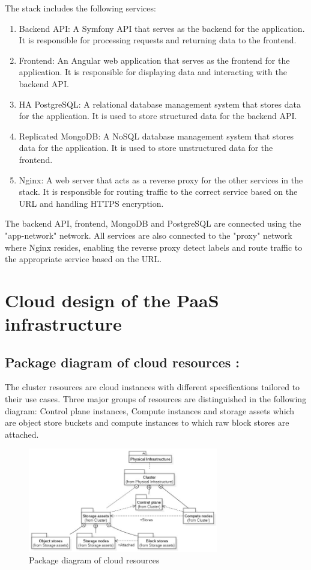 The stack includes the following services: 
\begin{enumerate}
\item Backend API: A Symfony\cite{Symfony} API that serves as the backend for the application. It is responsible for processing requests and returning data to the frontend. 
\item Frontend: An Angular\cite{Angular} web application that serves as the frontend for the application. It is responsible for displaying data and interacting with the backend API. 
\item HA PostgreSQL\cite{PostgreSQL}: A relational database management system that stores data for the application. It is used to store structured data for the backend API. 
\item Replicated MongoDB\cite{MongoDB}: A NoSQL database management system that stores data for the application. It is used to store unstructured data for the frontend. 
\item Nginx\cite{Nginx}: A web server that acts as a reverse proxy for the other services in the stack. It is responsible for routing traffic to the correct service based on the URL and handling HTTPS encryption. 
\end{enumerate}

The backend API, frontend, MongoDB and PostgreSQL are connected using the "app-network" network. All services are also connected to the "proxy" network where Nginx resides, enabling the reverse proxy detect labels and route traffic to the appropriate service based on the URL.

\newpage

\section{Cloud design of the PaaS infrastructure}
\subsection{Package diagram of cloud resources :}

The cluster resources are cloud instances with different specifications tailored to their use cases. Three major groups of resources are distinguished in the following diagram: Control plane instances, Compute instances and storage assets which are object store buckets and compute instances to which raw block stores are attached.

\begin{figure}[H]\centering
\includegraphics[width=0.74\textwidth,angle=00]{assets/f11.jpg}
\caption{Package diagram of cloud resources }
\label{fig:Package diagram of cloud resources }
\end{figure}

